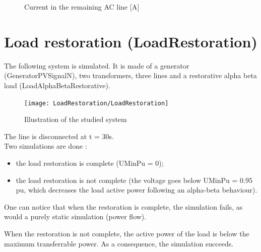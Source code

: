 \documentclass[a4paper, 12pt]{report}
\begin{document}
\begin{figure}[H]
  \caption{Current in the remaining AC line [A]}
\end{figure}

\section{Load restoration (LoadRestoration)}

The following system is simulated. It is made of a generator (GeneratorPVSignalN), two transformers, three lines and a restorative alpha beta load (LoadAlphaBetaRestorative).\\

\begin{figure}[H]
  \begin{center}
  \texttt{[image: LoadRestoration/LoadRestoration]}
  \end{center}
  \caption{Illustration of the studied system}
\end{figure}

The line is disconnected at t = 30s.\\
Two simulations are done :
\begin{itemize}
\item the load restoration is complete (UMinPu = 0);
\item the load restoration is not complete (the voltage goes below UMinPu = 0.95 pu, which decreases the load active power following an alpha-beta behaviour).
\end{itemize}

One can notice that when the restoration is complete, the simulation fails, as would a purely static simulation (power flow).

When the restoration is not complete, the active power of the load is below the maximum transferrable power. As a consequence, the simulation succeeds.
\end{document}
